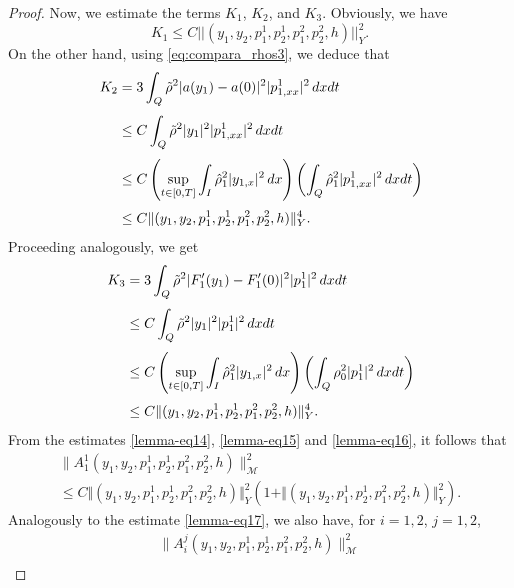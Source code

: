 \documentclass[11pt,a4paper]{amsart}
\numberwithin{equation}{section}
\begin{document}
\begin{proof}
     \noindent Now, we estimate the  terms  $K_{1}$,  $K_{2}$, and  $K_{3}$. Obviously, we have
    \begin{equation}\label{lemma-eq14}
        K_{1}\leq  C  ||(y_1,y_2,p^1_1,p^1_2,p^2_1,p^2_2,h)||^{2}_{Y}.
    \end{equation} On the other hand, using  \eqref{eq:compara_rhos3}, we  deduce  that
    \begin{equation}\label{lemma-eq15}
\begin{aligned}
\displaystyle 	K_{2}&=3\int_{Q}\tilde{\rho}^{2}|a(y_{1})-a(0)|^{2}|p^{1}_{1,xx}|^{2}\,dxdt\\
        \noalign{\smallskip}\phantom{AA}
      	&\displaystyle \leq C\int_{Q}\tilde{\rho}^{2}|y_{1}|^{2}|p^{1}_{1,xx}|^{2}\,dxdt\\
    	  \noalign{\smallskip}\phantom{AA}
    	&\displaystyle \leq C \left( \sup_{t\in [0,T]}\int_{I}\hat{\rho}^{2}_{1}|y_{1,x}|^{2}\,dx  \right)\left( \int_{Q}\hat{\rho}^{2}_{1}|p^{1}_{1,xx}|^{2}\,dxdt  \right)\\
    	  \noalign{\smallskip}\phantom{AA}
         & \leq C \Vert(y_1,y_2,p^1_1,p^1_2,p^2_1,p^2_2,h)\Vert^{4}_{Y}.
\end{aligned}
    \end{equation}Proceeding analogously, 
    we get
\begin{equation}\label{lemma-eq16}
\begin{aligned}
 \displaystyle 	K_{3}&=3\int_{Q}\tilde{\rho}^{2}|F'_{1}(y_{1})-F'_{1}(0)|^{2}|p^{1}_{1}|^{2}\,dxdt\\
    	  \noalign{\smallskip}\phantom{AA}
    	&\displaystyle \leq C\int_{Q}\tilde{\rho}^{2}|y_{1}|^{2}|p^{1}_{1}|^{2}\,dxdt\\
    	  \noalign{\smallskip}\phantom{AA}
    	&\displaystyle \leq C\left(  \sup_{t\in [0,T]}\int_{I}\hat{\rho}^{2}_{1}|y_{1,x}|^{2}\,dx  \right) \left(  \int_{Q}\rho^{2}_{0}|p^{1}_{1}|^{2}\,dxdt \right)\\
    	  \noalign{\smallskip}\phantom{AA}
         & \leq C \Vert(y_1,y_2,p^1_1,p^1_2,p^2_1,p^2_2,h)\Vert^{4}_{Y}.
\end{aligned}
\end{equation} From the estimates \eqref{lemma-eq14}, \eqref{lemma-eq15}  and  \eqref{lemma-eq16}, it follows that 
    \begin{equation}\label{lemma-eq17}
    	\begin{array}{l}
    		\parallel A_1^1 (y_1,y_2,p^1_1,p^1_2,p^2_1,p^2_2,h) \parallel^2_{\mathcal{M}}\\ [1.0em]
    		\leq C  \Vert(y_1,y_2,p^1_1,p^1_2,p^2_1,p^2_2,h)\Vert^{2}_{Y}(1+ \Vert(y_1,y_2,p^1_1,p^1_2,p^2_1,p^2_2,h)\Vert^{2}_{Y}).
    	\end{array}
    \end{equation} Analogously to the estimate \eqref{lemma-eq17}, we also have, for $i=1,2$, $j=1,2$,
    \begin{equation}\label{lemma-eq18}
    	\begin{array}{l}
    		\parallel A_i^j (y_1,y_2,p^1_1,p^1_2,p^2_1,p^2_2,h) \parallel^2_{\mathcal{M}}\\[1.0em]
    		

\end{array}
\end{equation}
\end{proof}
\end{document}
